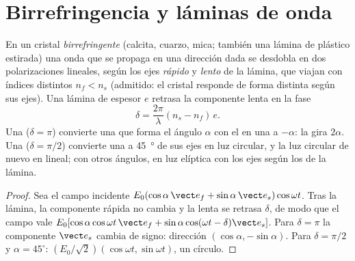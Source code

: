 \section{Birrefringencia y láminas de onda}

\begin{proposition}\label{prop:b2:plane-waves-polarization:plates}
En un cristal \emph{birrefringente} (calcita, cuarzo, mica; también una
lámina de plástico estirada) una onda que se propaga en una dirección dada
se desdobla en dos polarizaciones lineales, según los ejes \emph{rápido} y
\emph{lento} de la lámina, que viajan con índices distintos $n_f <
n_s$ (admitido: el cristal responde de forma distinta según sus ejes). Una
lámina de espesor $e$ retrasa la componente lenta en la fase
\[
\delta = \frac{2\pi}\lambda(n_s - n_f)\,e .
\]
Una \emph{} ($\delta = \pi$) convierte una 
que forma el ángulo $\alpha$ con el  en una  a $-\alpha$: la
gira $2\alpha$. Una \emph{} ($\delta = \pi/2$) convierte una
 a \qty{45}{\degree} de sus ejes en luz circular, y la luz
circular de nuevo en lineal; con otros ángulos, en luz elíptica con los
ejes según los de la lámina.
\end{proposition}

\begin{proof}
Sea el campo incidente $E_0(\cos\alpha\,\vect e_f + \sin\alpha\,\vect e_s)\cos\omega t$.
Tras la lámina, la componente rápida no cambia y la lenta se retrasa $\delta$,
de modo que el campo vale
$E_0[\cos\alpha\cos\omega t\,\vect e_f + \sin\alpha\cos(\omega t - \delta)
\vect e_s]$. Para $\delta = \pi$ la componente $\vect e_s$ cambia de signo: dirección
$(\cos\alpha, -\sin\alpha)$. Para $\delta = \pi/2$ y $\alpha = 45^\circ$: $(E_0/\sqrt2)(\cos
\omega t, \sin\omega t)$, un círculo.
\end{proof}

